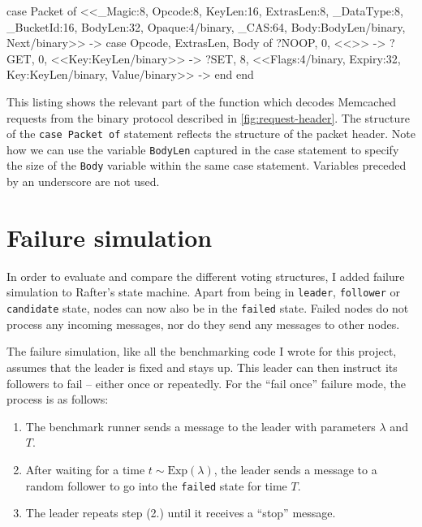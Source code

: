 \documentclass[draft,11pt,chapterprefix=true,toc=bibliography,numbers=noendperiod,
               footnotes=multiple,twoside]{scrreprt}
\begin{document}
\begin{listing}[p]
    \begin{erlangcode}
case Packet of
    <<_Magic:8,    Opcode:8,    KeyLen:16,
      ExtrasLen:8, _DataType:8, _BucketId:16,
      BodyLen:32,
      Opaque:4/binary,     %
      _CAS:64,             %
      Body:BodyLen/binary, %
      Next/binary>> ->     %
        case {Opcode, ExtrasLen, Body} of
            {?NOOP, 0, <<>>} ->
            {?GET,  0, <<Key:KeyLen/binary>>} ->
            {?SET,  8, <<Flags:4/binary, Expiry:32, Key:KeyLen/binary,
                         Value/binary>>} ->
        end
end
    \end{erlangcode}
    \caption[Request decoding in Erlang]{This listing shows the relevant part of the function which decodes Memcached requests from the binary protocol described in \autoref{fig:request-header}. The structure of the \texttt{case Packet of} statement reflects the structure of the packet header. Note how we can use the variable \texttt{BodyLen} captured in the case statement to specify the size of the \texttt{Body} variable within the same case statement. Variables preceded by an underscore are not used.}
    \label{lst:request-header}
\end{listing}

\section{Failure simulation}

In order to evaluate and compare the different voting structures, I added failure simulation to Rafter's state machine. Apart from being in \texttt{leader}, \texttt{follower} or \texttt{candidate} state, nodes can now also be in the \texttt{failed} state. Failed nodes do not process any incoming messages, nor do they send any messages to other nodes.

The failure simulation, like all the benchmarking code I wrote for this project, assumes that the leader is fixed and stays up. This leader can then instruct its followers to fail -- either once or repeatedly. For the \enquote{fail once} failure mode, the process is as follows:

\begin{enumerate}
    \item The benchmark runner sends a message to the leader with parameters \(\lambda\) and \(T\).
    \item After waiting for a time \(t \sim \text{Exp}(\lambda)\), the leader sends a message to a random follower to go into the \texttt{failed} state for time \(T\).
    \item The leader repeats step (2.) until it receives a \enquote{stop} message.
\end{enumerate}
\end{document}
